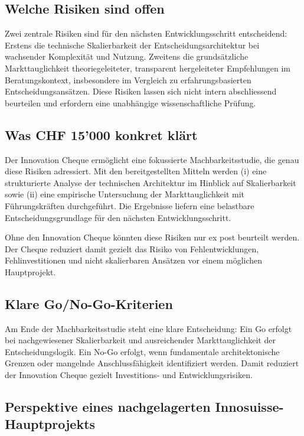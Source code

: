 \documentclass[11pt,a4paper]{article}
\begin{document}
\subsection{Welche Risiken sind offen}

Zwei zentrale Risiken sind für den nächsten Entwicklungsschritt entscheidend: Erstens die technische Skalierbarkeit der Entscheidungsarchitektur bei wachsender Komplexität und Nutzung. Zweitens die grundsätzliche Markttauglichkeit theoriegeleiteter, transparent hergeleiteter Empfehlungen im Beratungskontext, insbesondere im Vergleich zu erfahrungsbasierten Entscheidungsansätzen. Diese Risiken lassen sich nicht intern abschliessend beurteilen und erfordern eine unabhängige wissenschaftliche Prüfung.

\subsection{Was CHF 15'000 konkret klärt}

Der Innovation Cheque ermöglicht eine fokussierte Machbarkeitsstudie, die genau diese Risiken adressiert. Mit den bereitgestellten Mitteln werden (i) eine strukturierte Analyse der technischen Architektur im Hinblick auf Skalierbarkeit sowie (ii) eine empirische Untersuchung der Markttauglichkeit mit Führungskräften durchgeführt. Die Ergebnisse liefern eine belastbare Entscheidungsgrundlage für den nächsten Entwicklungsschritt.

Ohne den Innovation Cheque könnten diese Risiken nur ex post beurteilt werden. Der Cheque reduziert damit gezielt das Risiko von Fehlentwicklungen, Fehlinvestitionen und nicht skalierbaren Ansätzen vor einem möglichen Hauptprojekt.

\subsection{Klare Go/No-Go-Kriterien}

Am Ende der Machbarkeitsstudie steht eine klare Entscheidung: Ein Go erfolgt bei nachgewiesener Skalierbarkeit und ausreichender Markttauglichkeit der Entscheidungslogik. Ein No-Go erfolgt, wenn fundamentale architektonische Grenzen oder mangelnde Anschlussfähigkeit identifiziert werden. Damit reduziert der Innovation Cheque gezielt Investitions- und Entwicklungsrisiken.

\subsection{Perspektive eines nachgelagerten Innosuisse-Hauptprojekts}
\end{document}
